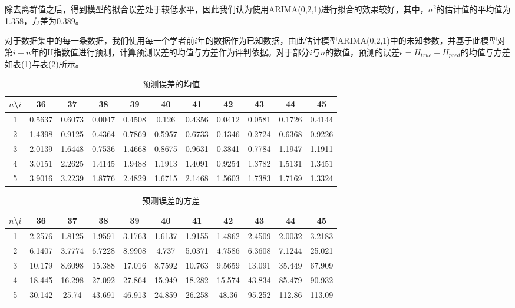 \documentclass[lang=cn,11pt,a4paper,cite=authoryear]{elegantpaper}
\begin{document}
除去离群值之后，得到模型的拟合误差处于较低水平，因此我们认为使用ARIMA(0,2,1)进行拟合的效果较好，其中，$\sigma^2$的估计值的平均值为1.358，方差为0.389。

对于数据集中的每一条数据，我们使用每一个学者前$i$年的数据作为已知数据，由此估计模型ARIMA(0,2,1)中的未知参数，并基于此模型对第$i+n$年的H指数值进行预测，计算预测误差的均值与方差作为评判依据。对于部分$i$与$n$的数值，预测的误差$\epsilon=H_{true}-H_{pred}$的均值与方差如表(\ref{tab5})与表(\ref{tab6})所示。

\begin{table}[H]
	\centering
	\caption{预测误差的均值}
	\label{tab5}
	\begin{tabular}{c|cccccccccc}
		$n$\textbackslash{}$i$ & 36     & 37     & 38     & 39     & 40     & 41     & 42     & 43     & 44     & 45     \\ \hline
		1                  & 0.5637 & 0.6073 & 0.0047 & 0.4508 & 0.126  & 0.4356 & 0.0412 & 0.0581 & 0.1726 & 0.4144 \\
		2                  & 1.4398 & 0.9125 & 0.4364 & 0.7869 & 0.5957 & 0.6733 & 0.1346 & 0.2724 & 0.6368 & 0.9226 \\
		3                  & 2.0139 & 1.6448 & 0.7536 & 1.4668 & 0.8675 & 0.9631 & 0.3841 & 0.7784 & 1.1947 & 1.1911 \\
		4                  & 3.0151 & 2.2625 & 1.4145 & 1.9488 & 1.1913 & 1.4091 & 0.9254 & 1.3782 & 1.5131 & 1.3451 \\
		5                  & 3.9016 & 3.2239 & 1.8776 & 2.4829 & 1.6715 & 2.1468 & 1.5603 & 1.7383 & 1.7169 & 1.3324
	\end{tabular}
\end{table}

\begin{table}[H]
	\centering
	\caption{预测误差的方差}
	\label{tab6}
	\begin{tabular}{c|cccccccccc}
		$n$\textbackslash{}$i$ & 36     & 37     & 38     & 39     & 40     & 41     & 42     & 43     & 44     & 45     \\ \hline
		1                  & 2.2576 & 1.8125 & 1.9591 & 3.1763 & 1.6137 & 1.9155 & 1.4862 & 2.4509 & 2.0032 & 3.2183 \\
		2                  & 6.1407 & 3.7774 & 6.7228 & 8.9908 & 4.737  & 5.0371 & 4.7586 & 6.3608 & 7.1244 & 25.021 \\
		3                  & 10.179 & 8.6098 & 15.388 & 17.016 & 8.7592 & 10.763 & 9.5659 & 13.091 & 35.449 & 67.909 \\
		4                  & 18.445 & 16.298 & 27.092 & 27.864 & 15.949 & 18.282 & 15.574 & 43.834 & 85.479 & 90.932 \\
		5                  & 30.142 & 25.74  & 43.691 & 46.913 & 24.859 & 26.258 & 48.36  & 95.252 & 112.86 & 113.09
	\end{tabular}
\end{table}
\end{document}
